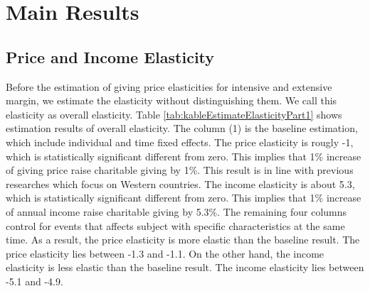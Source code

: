 \documentclass[ review  , 3p ]{elsarticle}
\begin{document}
  \hypertarget{main-results}{%
  \section{Main Results}\label{main-results}}

  \hypertarget{price-and-income-elasticity}{%
  \subsection{Price and Income Elasticity}\label{price-and-income-elasticity}}

  Before the estimation of giving price elasticities for intensive and extensive margin, we estimate the elasticity without distinguishing them. We call this elasticity as overall elasticity.
  Table \ref{tab:kableEstimateElasticityPart1} shows estimation results of overall elasticity.
  The column (1) is the baseline estimation, which include individual and time fixed effects.
  The price elasticity is rougly -1, which is statistically significant different from zero.
  This implies that 1\% increase of giving price raise charitable giving by 1\%.
  This result is in line with previous researches which focus on Western countries.
  The income elasticity is about 5.3, which is statistically significant different from zero.
  This implies that 1\% increase of annual income raise charitable giving by 5.3\%.
  The remaining four columns control for events that affects subject with specific characteristics at the same time.
  As a result, the price elasticity is more elastic than the baseline result.
  The price elasticity lies between -1.3 and -1.1.
  On the other hand, the income elasticity is less elastic than the baseline result.
  The income elasticity lies between -5.1 and -4.9.
\end{document}
